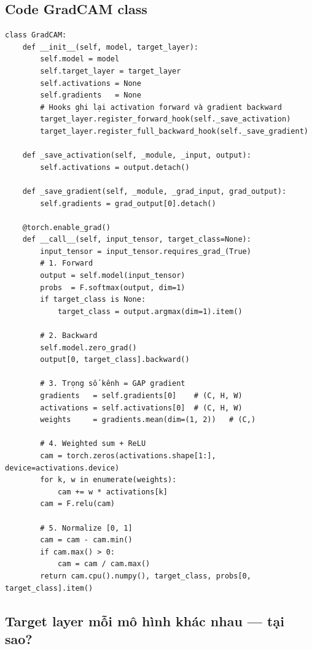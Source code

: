 \documentclass[11pt,a4paper]{article}
\begin{document}
\subsection{Code GradCAM class}

\begin{lstlisting}[caption={\texttt{src/utils/grad\_cam.py} --- rút gọn}]
class GradCAM:
    def __init__(self, model, target_layer):
        self.model = model
        self.target_layer = target_layer
        self.activations = None
        self.gradients   = None
        # Hooks ghi lại activation forward và gradient backward
        target_layer.register_forward_hook(self._save_activation)
        target_layer.register_full_backward_hook(self._save_gradient)

    def _save_activation(self, _module, _input, output):
        self.activations = output.detach()

    def _save_gradient(self, _module, _grad_input, grad_output):
        self.gradients = grad_output[0].detach()

    @torch.enable_grad()
    def __call__(self, input_tensor, target_class=None):
        input_tensor = input_tensor.requires_grad_(True)
        # 1. Forward
        output = self.model(input_tensor)
        probs  = F.softmax(output, dim=1)
        if target_class is None:
            target_class = output.argmax(dim=1).item()

        # 2. Backward
        self.model.zero_grad()
        output[0, target_class].backward()

        # 3. Trọng số kênh = GAP gradient
        gradients   = self.gradients[0]    # (C, H, W)
        activations = self.activations[0]  # (C, H, W)
        weights     = gradients.mean(dim=(1, 2))   # (C,)

        # 4. Weighted sum + ReLU
        cam = torch.zeros(activations.shape[1:], device=activations.device)
        for k, w in enumerate(weights):
            cam += w * activations[k]
        cam = F.relu(cam)

        # 5. Normalize [0, 1]
        cam = cam - cam.min()
        if cam.max() > 0:
            cam = cam / cam.max()
        return cam.cpu().numpy(), target_class, probs[0, target_class].item()
\end{lstlisting}

\subsection{Target layer mỗi mô hình khác nhau --- tại sao?}
\end{document}
